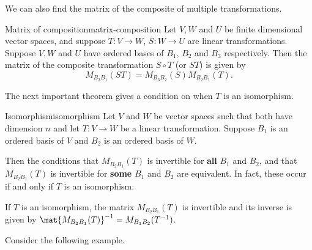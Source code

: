 We can also find the matrix of the composite of multiple transformations.

\begin{theorem}{Matrix of composition}{matrix-composition}
Let $V,W$ and $U$ be finite dimensional vector spaces, and suppose $T : V \to W$, $S: W \to U$ are linear transformations.
Suppose $V, W$ and $U$ have ordered bases of $B_1$, $B_2$ and $B_3$ respectively.  Then the matrix of the composite transformation $S \circ T$ (or $ST$) is given by
\[ M_{B_3B_1}(ST)=M_{B_3B_2}(S) M_{B_2B_1}(T).\]
\end{theorem}

The next important theorem gives a condition on when $T$ is an isomorphism.

\begin{theorem}{Isomorphism}{isomorphism}
Let $V$ and $W$ be vector spaces such that both have dimension $n$ and let $T: V \to W$ be a linear transformation. Suppose $B_1$ is an ordered basis of $V$ and $B_2$ is an ordered basis of $W$.

 Then the conditions that $M_{B_2B_1}(T)$ is invertible for \textbf{all} $B_1$ and $B_2$, and that $M_{B_2B_1}(T)$ is invertible for \textbf{some} $B_1$ and $B_2$ are equivalent. In fact, these occur if and only if $T$ is an isomorphism.

If $T$ is an isomorphism, the matrix $M_{B_2B_1}(T)$ is invertible and its inverse is given by $\mat{M_{B_2B_1}(T) } ^{-1} = M_{B_1B_2}(T^{-1})$.
\end{theorem}

Consider the following example.

